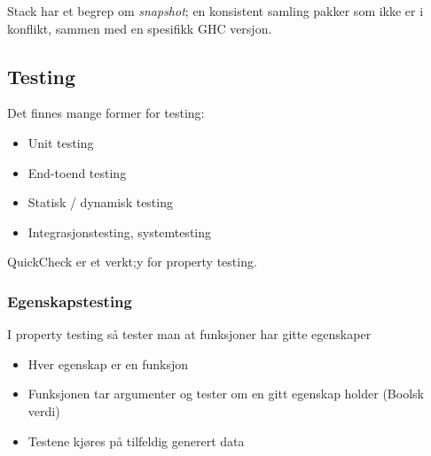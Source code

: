 \documentclass{article}
\begin{document}
Stack har et begrep om \textit{snapshot}; en konsistent samling pakker som ikke er i konflikt, sammen med en spesifikk GHC versjon.

\subsection{Testing}
Det finnes mange former for testing:
\begin{itemize}
    \item Unit testing
    \item End-toend testing
    \item Statisk / dynamisk testing
    \item Integrasjonstesting, systemtesting
\end{itemize}

QuickCheck er et verkt;y for property testing.

\subsubsection{Egenskapstesting}
I property testing så tester man at funksjoner har gitte egenskaper
\begin{itemize}
    \item Hver egenskap er en funksjon
    \item Funksjonen tar argumenter og tester om en gitt egenskap holder (Boolsk verdi)
    \item Testene kjøres på tilfeldig generert data
\end{itemize}
\end{document}
